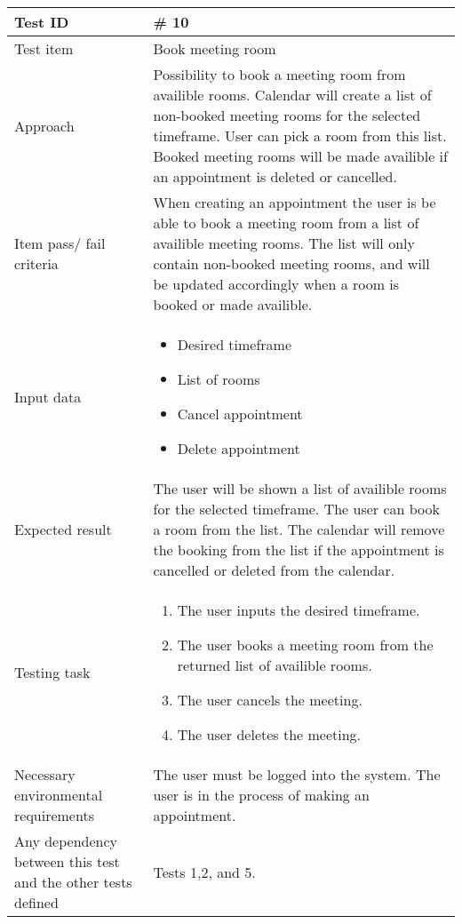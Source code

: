 \documentclass[a4paper, 10pt]{article}
\begin{document}
\begin{tabularx}{\textwidth}{ |X|X| }
\hline
\rowcolor{Gray}
Test ID & \# 10 \\ \hline
Test item & Book meeting room \\ \hline
Approach & Possibility to book a meeting room from availible rooms. Calendar will create a list of non-booked meeting rooms for the selected timeframe. User can pick a room from this list. Booked meeting rooms will be made availible if an appointment is deleted or cancelled.\\ \hline
Item pass/ fail criteria & When creating an appointment the user is be able to book a meeting room from a list of availible meeting rooms. The list will only contain non-booked meeting rooms, and will be updated accordingly when a room is booked or made availible.\\ \hline
Input data & 
\begin{itemize}
	\item Desired timeframe
	\item List of rooms
	\item Cancel appointment
	\item Delete appointment
\end{itemize}\\ \hline
Expected result & 
	The user will be shown a list of availible rooms for the selected timeframe. The user can book a room from the list. The calendar will remove the booking from the list if the appointment is cancelled or deleted from the calendar.\\ \hline
Testing task & 
\begin{enumerate}
    \item The user inputs the desired timeframe.
    \item The user books a meeting room from the returned list of availible rooms.
    \item The user cancels the meeting.
    \item The user deletes the meeting.
\end{enumerate}\\ \hline
Necessary environmental requirements & The user must be logged into the system. The user is in the process of making an appointment. \\ \hline
Any dependency between this test and the other tests defined & Tests 1,2, and 5.  \\ \hline

\end{tabularx}
\end{document}
